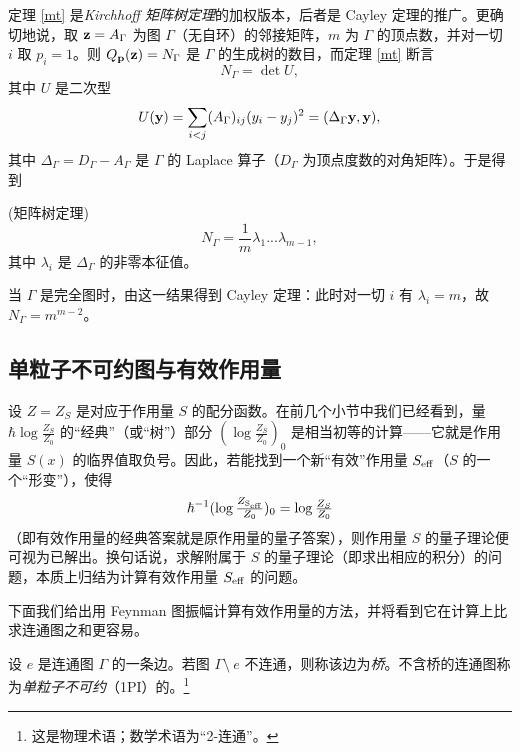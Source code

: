 
定理 \ref{mt} 是\emph{Kirchhoff 矩阵树定理}的加权版本，后者是 Cayley 定理的推广。更确切地说，取 $\bold z=A_\Gamma$ 为图 $\Gamma$（无自环）的邻接矩阵，$m$ 为 $\Gamma$ 的顶点数，并对一切 $i$ 取 $p_i=1$。则 $Q_{\bold p}(\bold z)=N_\Gamma$ 是 $\Gamma$ 的生成树的数目，而定理 \ref{mt} 断言
$$
N_\Gamma=\det U,
$$
其中 $U$ 是二次型
$$
U(\bold y)=\sum_{i<j}(A_\Gamma)_{ij}(y_i-y_j)^2=(\Delta_\Gamma \bold y,\bold y),
$$
其中 $\Delta_\Gamma=D_\Gamma-A_\Gamma$ 是 $\Gamma$ 的 Laplace 算子（$D_\Gamma$ 为顶点度数的对角矩阵）。于是得到

\begin{corollary} (矩阵树定理)
$$
N_\Gamma=\frac{1}{m}\lambda_1...\lambda_{m-1},
$$
其中 $\lambda_i$ 是 $\Delta_\Gamma$ 的非零本征值。
\end{corollary}

当 $\Gamma$ 是完全图时，由这一结果得到 Cayley 定理：此时对一切 $i$ 有 $\lambda_i=m$，故 $N_\Gamma=m^{m-2}$。

\subsection{单粒子不可约图与有效作用量}

设 $Z=Z_S$ 是对应于作用量 $S$ 的配分函数。在前几个小节中我们已经看到，量 $\hbar\log\frac{Z_S}{Z_0}$ 的“经典”（或“树”）部分 $(\log\frac{Z_S}{Z_0})_0$ 是相当初等的计算——它就是作用量 $S(x)$ 的临界值取负号。因此，若能找到一个新“有效”作用量 $S_{\rm eff}$（$S$ 的一个“形变”），使得
$$
\hbar^{-1}(\log\tfrac{Z_{\rm S_{\rm eff}}}{Z_0})_0=\log\tfrac{Z_S}{Z_0}
$$
（即有效作用量的经典答案就是原作用量的量子答案），则作用量 $S$ 的量子理论便可视为已解出。换句话说，求解附属于 $S$ 的量子理论（即求出相应的积分）的问题，本质上归结为计算有效作用量 $S_{\rm eff}$ 的问题。

下面我们给出用 Feynman 图振幅计算有效作用量的方法，并将看到它在计算上比求连通图之和更容易。

\begin{definition}
设 $e$ 是连通图 $\Gamma$ 的一条边。若图 $\Gamma\setminus\ e$ 不连通，则称该边为\emph{桥}。不含桥的连通图称为\emph{单粒子不可约}（1PI）的。\footnote{这是物理术语；数学术语为“2-连通”。}
\end{definition}


